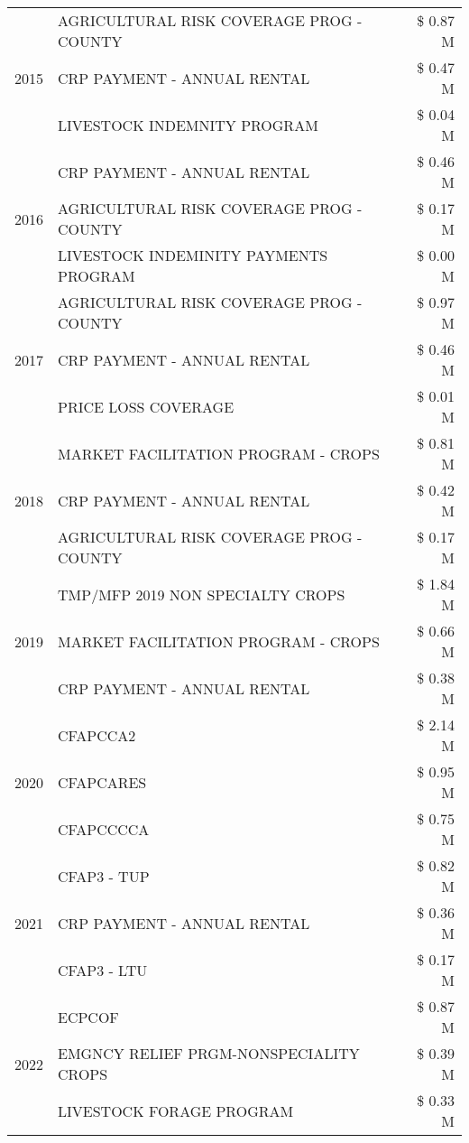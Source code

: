 \begin{tabular}{llr}
\cline{1-3}
\multirow[t]{3}{*}{2015} & AGRICULTURAL RISK COVERAGE PROG - COUNTY & \$ 0.87 M \\
 & CRP PAYMENT - ANNUAL RENTAL & \$ 0.47 M \\
 & LIVESTOCK INDEMNITY PROGRAM & \$ 0.04 M \\
\cline{1-3}
\multirow[t]{3}{*}{2016} & CRP PAYMENT - ANNUAL RENTAL & \$ 0.46 M \\
 & AGRICULTURAL RISK COVERAGE PROG - COUNTY & \$ 0.17 M \\
 & LIVESTOCK INDEMINITY PAYMENTS PROGRAM & \$ 0.00 M \\
\cline{1-3}
\multirow[t]{3}{*}{2017} & AGRICULTURAL RISK COVERAGE PROG - COUNTY & \$ 0.97 M \\
 & CRP PAYMENT - ANNUAL RENTAL & \$ 0.46 M \\
 & PRICE LOSS COVERAGE & \$ 0.01 M \\
\cline{1-3}
\multirow[t]{3}{*}{2018} & MARKET FACILITATION PROGRAM - CROPS & \$ 0.81 M \\
 & CRP PAYMENT - ANNUAL RENTAL & \$ 0.42 M \\
 & AGRICULTURAL RISK COVERAGE PROG - COUNTY & \$ 0.17 M \\
\cline{1-3}
\multirow[t]{3}{*}{2019} & TMP/MFP 2019 NON SPECIALTY CROPS & \$ 1.84 M \\
 & MARKET FACILITATION PROGRAM - CROPS & \$ 0.66 M \\
 & CRP PAYMENT - ANNUAL RENTAL & \$ 0.38 M \\
\cline{1-3}
\multirow[t]{3}{*}{2020} & CFAPCCA2 & \$ 2.14 M \\
 & CFAPCARES & \$ 0.95 M \\
 & CFAPCCCCA & \$ 0.75 M \\
\cline{1-3}
\multirow[t]{3}{*}{2021} & CFAP3 - TUP & \$ 0.82 M \\
 & CRP PAYMENT - ANNUAL RENTAL & \$ 0.36 M \\
 & CFAP3 - LTU & \$ 0.17 M \\
\cline{1-3}
\multirow[t]{3}{*}{2022} & ECPCOF & \$ 0.87 M \\
 & EMGNCY RELIEF PRGM-NONSPECIALITY CROPS & \$ 0.39 M \\
 & LIVESTOCK FORAGE PROGRAM & \$ 0.33 M \\
\cline{1-3}
\bottomrule
\end{tabular}
